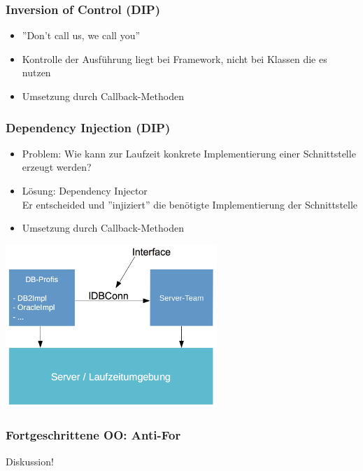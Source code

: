 \begin{frame}[fragile]
	\frametitle{Inversion of Control (DIP)}
	\begin{itemize}
	  \item ''Don't call us, we call you''
	  \item Kontrolle der Ausf\"uhrung liegt bei Framework,
	  nicht bei Klassen die es nutzen
	  \item Umsetzung durch Callback-Methoden
	\end{itemize}
\end{frame}   

\begin{frame}[fragile]
	\frametitle{Dependency Injection (DIP)}
	\begin{itemize}
	  \item Problem: Wie kann zur Laufzeit konkrete Implementierung
	  einer Schnittstelle erzeugt werden?
	  \item L\"osung: Dependency Injector\\
	  Er entscheided und ''injiziert'' die ben\"otigte Implementierung
	  der Schnittstelle
	  \item Umsetzung durch Callback-Methoden
	\end{itemize}
	\begin{center}
		\includegraphics[width=0.6\textwidth,
		keepaspectratio=true]{bilder/dependancy_injection.png}
	\end{center}
\end{frame}

\begin{frame}[fragile]
	\frametitle{Fortgeschrittene OO: Anti-For}
	\begin{center}
		\huge Diskussion!
	\end{center}
\end{frame} 